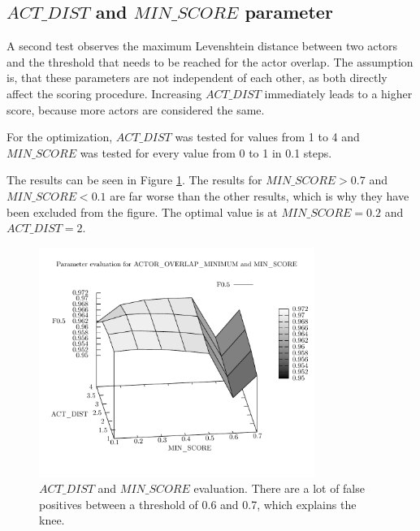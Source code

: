 \subsection{$ACT\_DIST$ and $MIN\_SCORE$ parameter}
A second test observes the maximum Levenshtein distance between two actors and the threshold that needs to be reached for the actor overlap.
The assumption is, that these parameters are not independent of each other, as both directly affect the scoring procedure.
Increasing $ACT\_DIST$ immediately leads to a higher score, because more actors are considered the same.

For the optimization, $ACT\_DIST$ was tested for values from 1 to 4 and $MIN\_SCORE$ was tested for every value from 0 to 1 in 0.1 steps.

The results can be seen in Figure \ref{fig_3d}.
The results for $MIN\_SCORE > 0.7$ and $MIN\_SCORE < 0.1$ are far worse than the other results, which is why they have been excluded from the figure.
The optimal value is at $MIN\_SCORE = 0.2$ and $ACT\_DIST = 2$.

\begin{figure}[h!]
  \begin{center}
  \includegraphics[width=0.8\textwidth]{images/3d.pdf}
  \end{center}
  \caption{$ACT\_DIST$  and $MIN\_SCORE$ evaluation. There are a lot of false positives between a threshold of 0.6 and 0.7, which explains the knee.}
  \label{fig_3d}
\end{figure}



